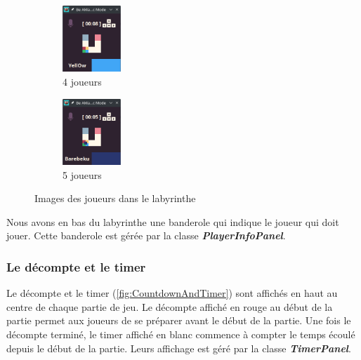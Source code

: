 \begin{figure}[!htb]
\begin{subfigure}{2.2cm}
        \includegraphics[width=2.2cm]{ressources/Implementation/Labyrinthe/Vue/Players/4Players.png}%
        \caption{4 joueurs}
        \label{fig:4Players}
    \end{subfigure}
    \qquad
    \begin{subfigure}{2.2cm}
        \includegraphics[width=2.2cm]{ressources/Implementation/Labyrinthe/Vue/Players/5Players.png}%
        \caption{5 joueurs}
        \label{fig:5Players}
    \end{subfigure}
    \caption{Images des joueurs dans le labyrinthe}
    \label{fig:PlayersInLabyrinth}
\end{figure}
\FloatBarrier

Nous avons en bas du labyrinthe une banderole qui indique le joueur qui doit jouer.
Cette banderole est gérée par la classe \textbf{\textit{PlayerInfoPanel}}.
\subsubsection*{Le décompte et le timer}

Le décompte et le timer (\ref{fig:CountdownAndTimer}) sont affichés en haut au centre de chaque partie de jeu. Le décompte affiché en rouge au début de la partie permet aux joueurs de se préparer avant le début de la partie. Une fois le décompte terminé, le timer affiché en blanc commence à compter le temps écoulé depuis le début de la partie. Leurs affichage est géré par la classe \textbf{\textit{TimerPanel}}.

